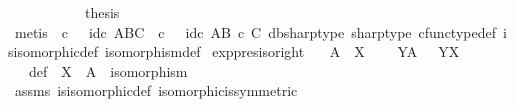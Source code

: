 \begin{isabellebody}
\ \ \ \ \isamarkupfalse%
\isanewline
\ \ \isamarkupfalse%
\isanewline
\ \ \isamarkupfalse%
\ {\isacharquery}{\kern0pt}thesis\isanewline
\ \ \ \ \isamarkupfalse%
\ {\isacharparenleft}{\kern0pt}metis\ {\isacartoucheopen}{\isasymphi}\isactrlsup {\isasymsharp}\isactrlsup {\isasymsharp}\ {\isasymcirc}\isactrlsub c\ {\isasympsi}\isactrlsup {\isasymsharp}\ {\isacharequal}{\kern0pt}\ id\isactrlsub c\ {\isacharparenleft}{\kern0pt}A\isactrlbsup B\isactrlesup \isactrlbsup C\isactrlesup {\isacharparenright}{\kern0pt}{\isacartoucheclose}\ {\isacartoucheopen}{\isasympsi}\isactrlsup {\isasymsharp}\ {\isasymcirc}\isactrlsub c\ {\isasymphi}\isactrlsup {\isasymsharp}\isactrlsup {\isasymsharp}\ {\isacharequal}{\kern0pt}\ id\isactrlsub c\ {\isacharparenleft}{\kern0pt}A\isactrlbsup {\isacharparenleft}{\kern0pt}B\ {\isasymtimes}\isactrlsub c\ C{\isacharparenright}{\kern0pt}\isactrlesup {\isacharparenright}{\kern0pt}{\isacartoucheclose}\ {\isasymphi}dbsharp{\isacharunderscore}{\kern0pt}type\ {\isasympsi}sharp{\isacharunderscore}{\kern0pt}type\ cfunc{\isacharunderscore}{\kern0pt}type{\isacharunderscore}{\kern0pt}def\ is{\isacharunderscore}{\kern0pt}isomorphic{\isacharunderscore}{\kern0pt}def\ isomorphism{\isacharunderscore}{\kern0pt}def{\isacharparenright}{\kern0pt}\isanewline
{}\isamarkupfalse%
%
\endisatagproof
{\isafoldproof}%
%
\isadelimproof
\isanewline
%
\endisadelimproof
\isanewline
{}\isamarkupfalse%
\ exp{\isacharunderscore}{\kern0pt}pres{\isacharunderscore}{\kern0pt}iso{\isacharunderscore}{\kern0pt}right{\isacharcolon}{\kern0pt}\isanewline
\ \ \ {\isachardoublequoteopen}A\ {\isasymcong}\ X{\isachardoublequoteclose}\ \isanewline
\ \ \ {\isachardoublequoteopen}Y\isactrlbsup A\isactrlesup \ {\isasymcong}\ \ Y\isactrlbsup X\isactrlesup {\isachardoublequoteclose}\isanewline
%
\isadelimproof
%
\endisadelimproof
%
\isatagproof
{}\isamarkupfalse%
\ {\isacharminus}{\kern0pt}\ \isanewline
\ \ \isamarkupfalse%
\ {\isasymphi}\ \ {\isasymphi}{\isacharunderscore}{\kern0pt}def{\isacharcolon}{\kern0pt}\ {\isachardoublequoteopen}{\isasymphi}{\isacharcolon}{\kern0pt}\ X\ {\isasymrightarrow}\ A\ {\isasymand}\ isomorphism{\isacharparenleft}{\kern0pt}{\isasymphi}{\isacharparenright}{\kern0pt}{\isachardoublequoteclose}\isanewline
\ \ \ \ \isamarkupfalse%
\ assms\ is{\isacharunderscore}{\kern0pt}isomorphic{\isacharunderscore}{\kern0pt}def\ isomorphic{\isacharunderscore}{\kern0pt}is{\isacharunderscore}{\kern0pt}symmetric\ \isamarkupfalse%

\end{isabellebody}
